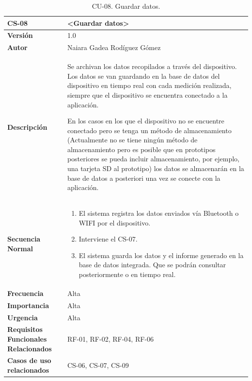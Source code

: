 \begin{table}[h!]
\centering
\begin{tabular}{ |m{3cm}|m{11cm}|  } 
\hline
\cellcolor[HTML]{B9E3F0}\textbf{CS-08} & \cellcolor[HTML]{B9E3F0}\textbf{<Guardar datos>}\\

\hline
\cellcolor[HTML]{EFEFEF}\textbf{Versión}             & 1.0  \\
\hline
\cellcolor[HTML]{EFEFEF}\textbf{Autor}                & Naiara Gadea Rodíguez Gómez\\
\hline
\cellcolor[HTML]{EFEFEF}\textbf{Descripción}                & {Se archivan los datos recopilados a través del dispositivo. Los datos se van guardando en la base de datos del dispositivo en tiempo real con cada medición realizada, siempre que el dispositivo se encuentra conectado a la aplicación. 

En los casos en los que el dispositivo no se encuentre conectado pero se tenga un método de almacenamiento (Actualmente no se tiene ningún método de almacenamiento pero es posible que en prototipos posteriores se pueda incluir almacenamiento, por ejemplo, una tarjeta SD al prototipo) los datos se almacenarán en la base de datos a posteriori una vez se conecte con la aplicación.}\\
\hline
\cellcolor[HTML]{EFEFEF}\textbf{Secuencia \newline Normal}                &                 
        \begin{enumerate}
			\def\labelenumi{\arabic{enumi}.}
			\tightlist
			\item El sistema registra los datos enviados vía Bluetooth o WIFI por el dispositivo.
			\item Interviene el CS-07.
                \item El sistema guarda los datos y el informe generado en la base de datos integrada. Que se podrán consultar posteriormente o en tiempo real.
		\end{enumerate}\\
\hline
\cellcolor[HTML]{EFEFEF}\textbf{Frecuencia}                & Alta\\
\hline
\cellcolor[HTML]{EFEFEF}\textbf{Importancia}                & Alta\\
\hline
\cellcolor[HTML]{EFEFEF}\textbf{Urgencia}                & Alta\\
\hline
\cellcolor[HTML]{EFEFEF}\textbf{Requisitos Funcionales Relacionados}                & {RF-01, RF-02, RF-04, RF-06} \\
\hline
\cellcolor[HTML]{EFEFEF}\textbf{Casos de uso relacionados}                & {CS-06, CS-07, CS-09}\\
\hline
\end{tabular}
\caption{CU-08. Guardar datos.}
\end{table}

